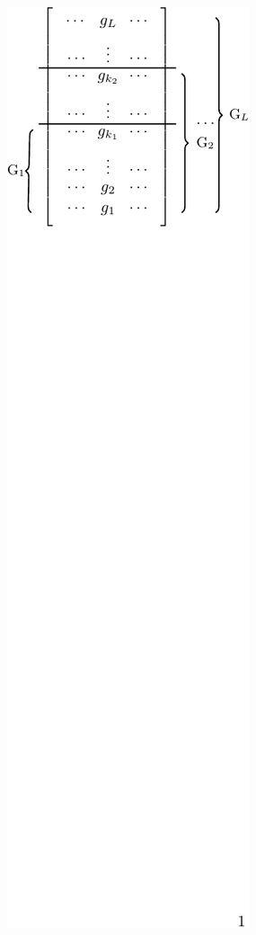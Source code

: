 \documentclass[10pt]{beamer}
\begin{document}
\begin{frame}
\begin{columns}[t]
		\begin{column}{0.39\textwidth}
						\begin{figure}
							{\includegraphics[width=0.95\columnwidth]{Nested_generator_matrix.pdf}} %
				  	\end{figure}
        \end{column}
    \end{columns}    
\end{frame}
\end{document}
